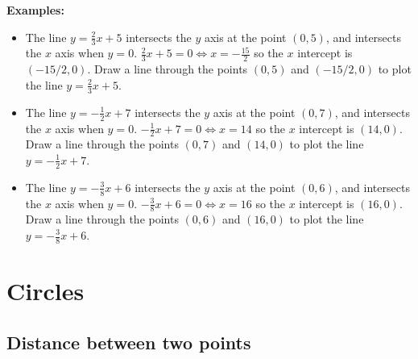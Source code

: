 \documentclass{article}
\begin{document}
\textbf{Examples:}
\begin{itemize}
\item The line \(y = \frac{2}{3}x + 5\) intersects the \(y\) axis at the point \((0, 5)\), and intersects the \(x\) axis when \(y = 0\). \(\frac{2}{3}x + 5 = 0 \iff x = -\frac{15}{2}\) so the \(x\) intercept is \((-15/2, 0)\). Draw a line through the points \((0, 5)\) and \((-15/2, 0)\) to plot the line \(y = \frac{2}{3}x + 5\).
\item The line \(y = -\frac{1}{2}x + 7\) intersects the \(y\) axis at the point \((0, 7)\), and intersects the \(x\) axis when \(y = 0\). \(-\frac{1}{2}x + 7 = 0 \iff x = 14\) so the \(x\) intercept is \((14, 0)\). Draw a line through the points \((0, 7)\) and \((14, 0)\) to plot the line \(y = -\frac{1}{2}x + 7\).
\item The line \(y = -\frac{3}{8}x + 6\) intersects the \(y\) axis at the point \((0, 6)\), and intersects the \(x\) axis when \(y = 0\). \(-\frac{3}{8}x + 6 = 0 \iff x = 16\) so the \(x\) intercept is \((16, 0)\). Draw a line through the points \((0, 6)\) and \((16, 0)\) to plot the line \(y = -\frac{3}{8}x + 6\).
\end{itemize}





\section*{Circles}

\subsection*{Distance between two points}
\end{document}
